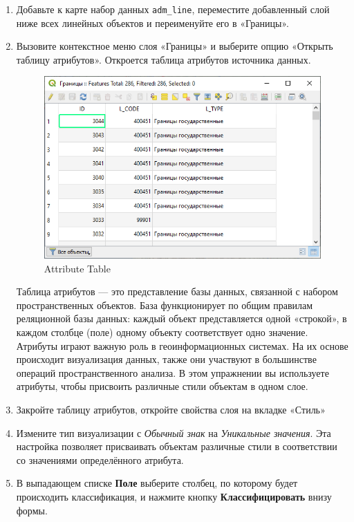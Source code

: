 \documentclass[
  12pt,
]{book}
\begin{document}
\begin{enumerate}
\def\labelenumi{\arabic{enumi}.}
\item
  Добавьте к карте набор данных \texttt{adm\_line}, переместите добавленный слой ниже всех линейных объектов и переименуйте его в «Границы».
\item
  Вызовите контекстное меню слоя «Границы» и выберите опцию «Открыть таблицу атрибутов». Откроется таблица атрибутов источника данных.

  \begin{figure}
  \centering
  \includegraphics{images/Ex01/AttributeTable.png}
  \caption{Attribute Table}
  \end{figure}

  Таблица атрибутов --- это представление базы данных, связанной с набором пространственных объектов. База функционирует по общим правилам реляционной базы данных: каждый объект представляется одной «строкой», в каждом столбце (поле) одному объекту соответствует одно значение. Атрибуты играют важную роль в геоинформационных системах. На их основе происходит визуализация данных, также они участвуют в большинстве операций пространственного анализа. В этом упражнении вы используете атрибуты, чтобы присвоить различные стили объектам в одном слое.
\item
  Закройте таблицу атрибутов, откройте свойства слоя на вкладке «Стиль»
\item
  Измените тип визуализации с \emph{Обычный знак} на \emph{Уникальные значения}. Эта настройка позволяет присваивать объектам различные стили в соответствии со значениями определённого атрибута.
\item
  В выпадающем списке \textbf{Поле} выберите столбец, по которому будет происходить классификация, и нажмите кнопку \textbf{Классифицировать} внизу формы.


\end{enumerate}
\end{document}
